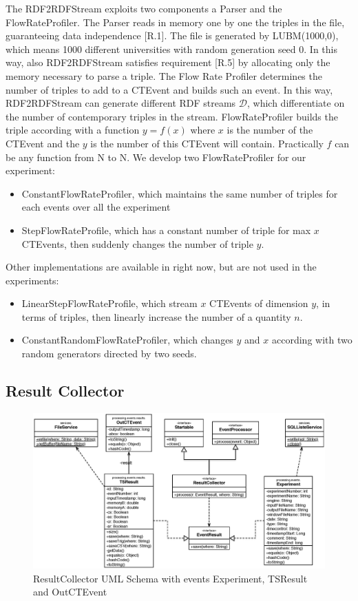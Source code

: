The RDF2RDFStream exploits two components a Parser and the FlowRateProfiler. The Parser reads in memory one by one the triples in the file, guaranteeing data independence [R.1]. The file is generated by LUBM(1000,0), which means 1000 different universities with random generation seed 0. In this way, also RDF2RDFStream satisfies requirement [R.5] by allocating only the memory necessary to parse a triple. The Flow Rate Profiler determines the number of triples to add to a CTEvent and builds such an event. In this way, RDF2RDFStream can generate different RDF streams $\mathcal{D}$, which differentiate on the number of contemporary triples in the stream. FlowRateProfiler builds the triple according with a function $y=f(x)$ where $x$ is the number of the CTEvent and the $y$ is the number of this CTEvent will contain. Practically $f$ can be any function from N to N. We develop two FlowRateProfiler for our experiment: 
\begin{itemize}
\item ConstantFlowRateProfiler, which maintains the same number of triples for each events over all the experiment  
\item StepFlowRateProfile, which has a constant number of triple for max $x$ CTEvents, then suddenly changes the number of triple $y$.
\end{itemize}
Other implementations are available in \name right now, but are not used in the experiments:
\begin{itemize}
\item LinearStepFlowRateProfile, which stream $x$ CTEvents of dimension $y$, in terms of triples, then linearly increase the number of a quantity $n$.
\item ConstantRandomFlowRateProfiler, which changes $y$ and $x$ according with two random generators directed by two seeds.
\end{itemize}

\subsection{Result Collector} 

\begin{figure}[tbh]
  \centering
	\includegraphics[width=\linewidth]{images/uml_resultcollector}
	\caption{ResultCollector UML Schema with events Experiment, TSResult and OutCTEvent} 
  	\label{fig:resultcollector}
\end{figure}

